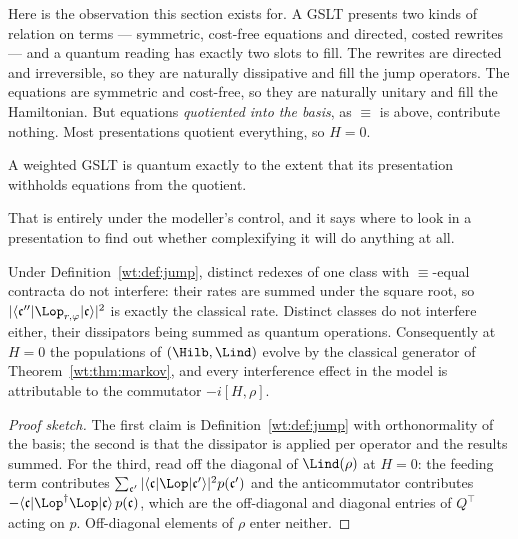Here is the observation this section exists for. A GSLT presents two kinds of relation on
terms --- symmetric, cost-free equations and directed, costed rewrites --- and a quantum
reading has exactly two slots to fill. The rewrites are directed and irreversible, so they
are naturally dissipative and fill the jump operators. The equations are symmetric and
cost-free, so they are naturally unitary and fill the Hamiltonian. But equations
\emph{quotiented into the basis}, as $\equiv$ is above, contribute nothing. Most
presentations quotient everything, so $H = 0$.

\begin{principle}
\label{wt:prin:slogan}
A weighted GSLT is quantum exactly to the extent that its presentation withholds equations
from the quotient.
\end{principle}

That is entirely under the modeller's control, and it says where to look in a presentation
to find out whether complexifying it will do anything at all.

\begin{proposition}
\label{wt:prop:interference}
Under Definition~\ref{wt:def:jump}, distinct redexes of one class with $\equiv$-equal
contracta do not interfere: their rates are summed under the square root, so
$|\langle\mathfrak{c}''|\Lop_{r,\varphi}|\mathfrak{c}\rangle|^2$ is exactly the classical
rate. Distinct classes do not interfere either, their dissipators being summed as quantum
operations. Consequently at $H = 0$ the populations of $(\Hilb,\Lind)$ evolve by the
classical generator of Theorem~\ref{wt:thm:markov}, and every interference effect in the
model is attributable to the commutator $-i[H,\rho]$.
\end{proposition}

\begin{proof}[Proof sketch]
The first claim is Definition~\ref{wt:def:jump} with orthonormality of the basis; the
second is that the dissipator is applied per operator and the results summed. For the
third, read off the diagonal of $\Lind(\rho)$ at $H=0$: the feeding term contributes
$\sum_{\mathfrak{c}'}|\langle\mathfrak{c}|\Lop|\mathfrak{c}'\rangle|^2 p(\mathfrak{c}')$ and
the anticommutator contributes
$-\langle\mathfrak{c}|\Lop^{\dagger}\Lop|\mathfrak{c}\rangle\,p(\mathfrak{c})$, which are the
off-diagonal and diagonal entries of $Q^{\!\top}$ acting on $p$. Off-diagonal elements of
$\rho$ enter neither.
\end{proof}

